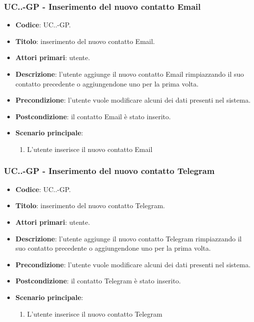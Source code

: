 			\subsubsection{UC\theuccount.\thesubuccount.\thesubsubuccount-GP - Inserimento del nuovo contatto Email}
				\begin{itemize}
					\item \textbf{Codice}: UC\theuccount.\thesubuccount.\thesubsubuccount-GP.
					\item \textbf{Titolo}: inserimento del nuovo contatto Email.
					\item \textbf{Attori primari}: utente.
					\item \textbf{Descrizione}: l'utente aggiunge il nuovo contatto Email rimpiazzando il suo contatto precedente o aggiungendone uno per la prima volta.
					\item \textbf{Precondizione}: l'utente vuole modificare alcuni dei dati presenti nel sistema.
					\item \textbf{Postcondizione}: il contatto Email è stato inserito.
					\item \textbf{Scenario principale}:
					\begin{enumerate}
						\item L'utente inserisce il nuovo contatto Email
					\end{enumerate}
				\end{itemize}

			\subsubsection{UC\theuccount.\thesubuccount.\thesubsubuccount-GP - Inserimento del nuovo contatto Telegram}

				\begin{itemize}
					\item \textbf{Codice}: UC\theuccount.\thesubuccount.\thesubsubuccount-GP.
					\item \textbf{Titolo}: inserimento del nuovo contatto Telegram.
					\item \textbf{Attori primari}: utente.
					\item \textbf{Descrizione}: l'utente aggiunge il nuovo contatto Telegram rimpiazzando il suo contatto precedente o aggiungendone uno per la prima volta.
					\item \textbf{Precondizione}: l'utente vuole modificare alcuni dei dati presenti nel sistema.
					\item \textbf{Postcondizione}: il contatto Telegram è stato inserito.
					\item \textbf{Scenario principale}:
					\begin{enumerate}
						\item L'utente inserisce il nuovo contatto Telegram
					\end{enumerate}
				\end{itemize}

